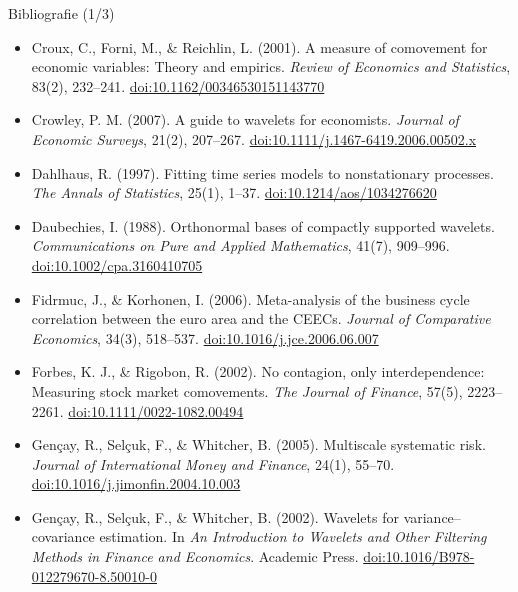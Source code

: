 \begin{frame}{Bibliografie (1/3)}
\begin{itemize}
    \item Croux, C., Forni, M., \& Reichlin, L. (2001). A measure of comovement for economic variables: Theory and empirics. \textit{Review of Economics and Statistics}, 83(2), 232--241. \href{https://doi.org/10.1162/00346530151143770}{doi:10.1162/00346530151143770}
    \item Crowley, P. M. (2007). A guide to wavelets for economists. \textit{Journal of Economic Surveys}, 21(2), 207--267. \href{https://doi.org/10.1111/j.1467-6419.2006.00502.x}{doi:10.1111/j.1467-6419.2006.00502.x}
    \item Dahlhaus, R. (1997). Fitting time series models to nonstationary processes. \textit{The Annals of Statistics}, 25(1), 1--37. \href{https://doi.org/10.1214/aos/1034276620}{doi:10.1214/aos/1034276620}
    \item Daubechies, I. (1988). Orthonormal bases of compactly supported wavelets. \textit{Communications on Pure and Applied Mathematics}, 41(7), 909--996. \href{https://doi.org/10.1002/cpa.3160410705}{doi:10.1002/cpa.3160410705}
    \item Fidrmuc, J., \& Korhonen, I. (2006). Meta-analysis of the business cycle correlation between the euro area and the CEECs. \textit{Journal of Comparative Economics}, 34(3), 518--537. \href{https://doi.org/10.1016/j.jce.2006.06.007}{doi:10.1016/j.jce.2006.06.007}
    \item Forbes, K. J., \& Rigobon, R. (2002). No contagion, only interdependence: Measuring stock market comovements. \textit{The Journal of Finance}, 57(5), 2223--2261. \href{https://doi.org/10.1111/0022-1082.00494}{doi:10.1111/0022-1082.00494}
    \item Gençay, R., Selçuk, F., \& Whitcher, B. (2005). Multiscale systematic risk. \textit{Journal of International Money and Finance}, 24(1), 55--70. \href{https://doi.org/10.1016/j.jimonfin.2004.10.003}{doi:10.1016/j.jimonfin.2004.10.003}
    \item Gençay, R., Selçuk, F., \& Whitcher, B. (2002). Wavelets for variance--covariance estimation. In \textit{An Introduction to Wavelets and Other Filtering Methods in Finance and Economics}. Academic Press. \href{https://doi.org/10.1016/B978-012279670-8.50010-0}{doi:10.1016/B978-012279670-8.50010-0}
\end{itemize}
\end{frame}

